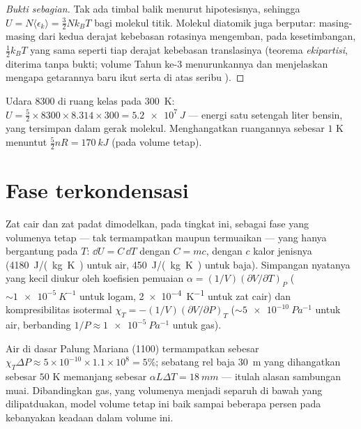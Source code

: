 \begin{proof}[Bukti sebagian]
Tak ada  timbal balik menurut hipotesisnya, sehingga $U = N\langle\epsilon_k\rangle
= \tfrac32 Nk_BT$ bagi molekul titik. Molekul diatomik juga berputar:
masing-masing dari kedua derajat kebebasan rotasinya mengemban, pada kesetimbangan,
$\tfrac12 k_BT$ yang sama seperti tiap derajat kebebasan translasinya (teorema
\emph{ekipartisi}, diterima tanpa bukti; volume Tahun ke-3 menurunkannya dan menjelaskan mengapa
getarannya baru ikut serta di atas seribu ).
\end{proof}

\begin{example}\label{ex:b1:kinetic-theory:room}
Udara \qty{8300}{} di ruang kelas pada \qty{300}{K}: $U = \tfrac52 \times
8300 \times 8.314 \times 300 = \qty{5.2e7}{J}$ --- energi satu setengah liter
bensin, yang tersimpan dalam gerak molekul. Menghangatkan ruangannya sebesar $1$ K
menuntut $\tfrac52 nR = \qty{170}{kJ}$ (pada volume tetap).
\end{example}

\section{Fase terkondensasi}

\begin{proposition}\label{prop:b1:kinetic-theory:condensed}
Zat cair dan zat padat dimodelkan, pada tingkat ini, sebagai fase yang
volumenya tetap --- tak termampatkan maupun termuaikan --- yang 
hanya bergantung pada $T$: $\dd U = C\,\dd T$ dengan $C = mc$, dengan $c$ kalor
jenisnya (\qty{4180}{J/(kg.K)} untuk air, \qty{450}{J/(kg.K)} untuk
baja). Simpangan nyatanya yang kecil diukur oleh koefisien pemuaian
$\alpha = (1/V)(\partial V/\partial T)_P$ ($\sim\qty{1e-5}{K^{-1}}$
untuk logam, \qty{2e-4}{K^{-1}} untuk zat cair) dan
kompresibilitas isotermal $\chi_T = -(1/V)(\partial V/\partial P)_T$ ($\sim\qty{5e-10}{Pa^{-1}}$
untuk air, berbanding $1/P \approx \qty{1e-5}{Pa^{-1}}$ untuk gas).
\end{proposition}
\admitted

\begin{example}\label{ex:b1:kinetic-theory:water}
Air di dasar Palung Mariana (\qty{1100}{}) termampatkan
sebesar $\chi_T\Delta P \approx 5\times10^{-10} \times 1.1\times10^8 = 5\%$; sebatang
rel baja \qty{30}{m} yang dihangatkan sebesar $50$ K memanjang sebesar $\alpha L\Delta T =
\qty{18}{mm}$ --- itulah alasan sambungan muai. Dibandingkan gas, yang
volumenya menjadi separuh di bawah  yang dilipatduakan, model volume tetap ini
baik sampai beberapa persen pada kebanyakan keadaan dalam volume ini.
\end{example}

